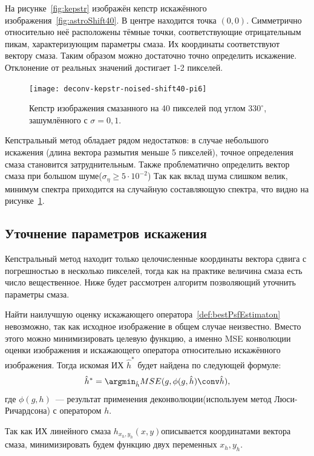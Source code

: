 На рисунке~\ref{fig:kepstr} изображён кепстр искажённого изображения~\ref{fig:astroShift40}. В центре находится точка $(0,0)$. Симметрично относительно неё расположены тёмные точки, соответствующие отрицательным пикам, характеризующим параметры смаза. Их координаты соответствуют вектору смаза. Таким образом можно достаточно точно определить искажение. Отклонение от реальных значений достигает 1-2 пикселей.

\begin{figure}[h!]
	\centerline{\texttt{[image: deconv-kepstr-noised-shift40-pi6]}}
	\caption{Кепстр изображения смазанного на 40 пикселей под углом $330^{\circ}$, зашумлённого с $\sigma=0,1$.}
	\label{fig:kepstrNoised}
\end{figure}
Кепстральный метод обладает рядом недостатков: в случае небольшого искажения (длина вектора размытия меньше 5 пикселей), точное определения смаза становится затруднительным. Также проблематично определить вектор смаза при большом шуме($\sigma_\eta \geq 5\cdot 10^{-2}$)\cite{panfilovaThesis} Так как вклад шума слишком велик, минимум спектра приходится на случайную составляющую спектра, что видно на рисунке~\ref{fig:kepstrNoised}.

\subsection{Уточнение параметров искажения}
Кепстральный метод находит только целочисленные координаты вектора сдвига с погрешностью в несколько пикселей, тогда как на практике величина смаза есть число вещественное. Ниже будет рассмотрен алгоритм позволяющий уточнить параметры смаза.

Найти наилучшую оценку искажающего оператора~\ref{def:bestPsfEstimaton} невозможно, так как исходное изображение в общем случае неизвестно. Вместо этого можно минимизировать целевую функцию, а именно MSE конволюции оценки изображения и искажающего оператора относительно искажённого изображения. Тогда искомая ИХ $\hat{h}^*$ будет найдена по следующей формуле:
\begin{equation}\label{eq:bestPsfModified}
\hat{h}^* = \argmin_{\hat{h}} MSE(g, \phi(g,\hat{h}) \conv \hat{h}),
\end{equation}
где $\phi(g, h)$~--- результат применения деконволюции(используем метод Люси-Ричардсона) с оператором $h$.

Так как ИХ линейного смаза $h_{x_h,y_h}(x,y)$описывается координатами вектора смаза, минимизировать будем функцию двух переменных $x_h, y_h$.

